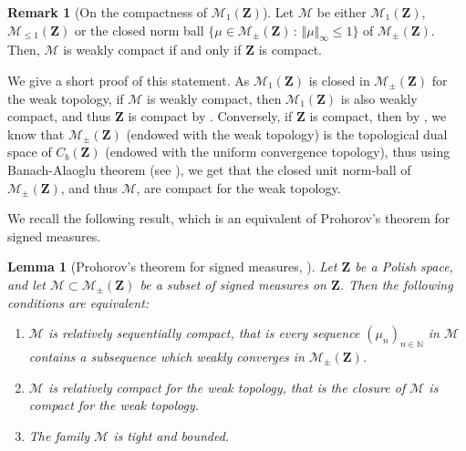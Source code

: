 \documentclass{amsart}
\theoremstyle{plain}
\newtheorem{lemme}[Th]{Lemma}
\theoremstyle{definition}
\newtheorem{remark}[Th]{Remark}
\newcommand{\Space}{\mathbf{Z}}
\newcommand{\cm}{\mathcal{M}}
\newcommand{\cM}{\mathcal{M}}
\newcommand{\Proba}{\mathcal{M}_1(\Space)}
\newcommand{\SubProba}{\mathcal{M}_{\leq1}(\Space)}
\newcommand{\SignedMeas}{\mathcal{M}_{\pm}(\Space)}
\newcommand{\CbFunct}{C_b(\Space)}
\newcommand{\TM}[1]{\norm{#1}_\infty}
\newcommand{\N}{\mathbb{N}}
\newcommand{\norm}[1]{\Vert#1\Vert}
\begin{document}
\begin{remark}[On the compactness of $\Proba$]
	\label{rem_Proba_compact}
Let $\cM$ be either $\Proba$, $\SubProba$ or the closed norm ball 
	$\{ \mu\in\SignedMeas \, : \, \TM{\mu} \leq 1\}$
	of $\SignedMeas$.
Then, $\cM$ is weakly compact if and only if $\Space$ is compact.

We give a short proof of this statement.
As $\Proba$ is closed in $\SignedMeas$ for the weak topology,
if $\cM$ is weakly compact, then $\Proba$ is also weakly compact,
and thus $\Space$ is compact by \cite[Theorem~3.4]{Varadarajan}.
Conversely, if $\Space$ is compact,
	then by \cite[Theorem 1.3.3]{Bogachev},
	we know that $\SignedMeas$ (endowed with the weak topology)
	is the topological dual space of $\CbFunct$ (endowed with the uniform convergence topology),
	thus using Banach-Alaoglu theorem (see \cite[Theorem 1.3.6]{Bogachev}),
	we get that the closed unit norm-ball of $\SignedMeas$,
		and thus $\cM$, are compact for the weak topology.
\end{remark}


We recall the following result, which is an equivalent of Prohorov's theorem
for signed measures.
\begin{lemme}[Prohorov's theorem for signed measures, {\cite[Theorems 2.3.4 and  3.1.9]{Bogachev}}]
	\label{lemme_Bogachev_Prohorov_theorem}
Let $\Space$ be a Polish space, and let $\cm \subset \SignedMeas$
be a subset of signed measures on $\Space$.
Then the following conditions are equivalent:
\begin{enumerate}[label=(\roman*)]
\item
$\cm$ is relatively sequentially compact, that is
every sequence $(\mu_n)_{n\in\N}$ in $\cm$ contains a subsequence
	which weakly converges in $\SignedMeas$.
\item
$\cM$ is relatively compact for the weak topology,
	that is the closure of $\cM$ is compact for the weak topology.
\item
The family $\cm$ is tight and bounded.
\end{enumerate}
\end{lemme}
\end{document}
